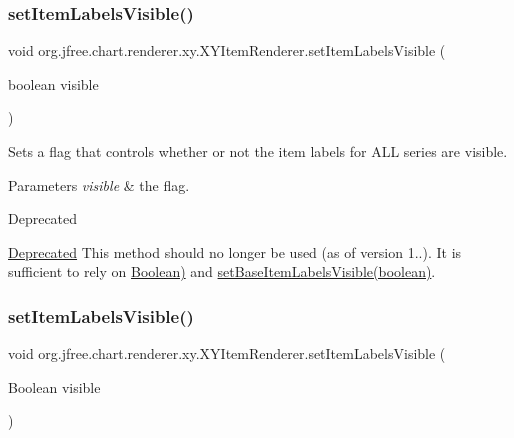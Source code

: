 \subsubsection{\texorpdfstring{set\+Item\+Labels\+Visible()}{setItemLabelsVisible()}\hspace{0.1cm}{\footnotesize\ttfamily [1/3]}}
{\footnotesize\ttfamily void org.\+jfree.\+chart.\+renderer.\+xy.\+X\+Y\+Item\+Renderer.\+set\+Item\+Labels\+Visible (\begin{DoxyParamCaption}\item[{boolean}]{visible }\end{DoxyParamCaption})}

Sets a flag that controls whether or not the item labels for A\+LL series are visible.


\begin{DoxyParams}{Parameters}
{\em visible} & the flag.\\
\hline
\end{DoxyParams}
\begin{DoxyRefDesc}{Deprecated}
\item[\mbox{\hyperlink{deprecated__deprecated000224}{Deprecated}}]This method should no longer be used (as of version 1..). It is sufficient to rely on \mbox{\hyperlink{}{Boolean)}} and \mbox{\hyperlink{interfaceorg_1_1jfree_1_1chart_1_1renderer_1_1xy_1_1_x_y_item_renderer_ac684655063a646d75697136fd62a65aa}{set\+Base\+Item\+Labels\+Visible(boolean)}}. \end{DoxyRefDesc}
\mbox{\label{interfaceorg_1_1jfree_1_1chart_1_1renderer_1_1xy_1_1_x_y_item_renderer_aaa1db57ae471204a43bfabfc6d8adbc2}} 
\subsubsection{\texorpdfstring{set\+Item\+Labels\+Visible()}{setItemLabelsVisible()}\hspace{0.1cm}{\footnotesize\ttfamily [2/3]}}
{\footnotesize\ttfamily void org.\+jfree.\+chart.\+renderer.\+xy.\+X\+Y\+Item\+Renderer.\+set\+Item\+Labels\+Visible (\begin{DoxyParamCaption}\item[{Boolean}]{visible }\end{DoxyParamCaption})}

